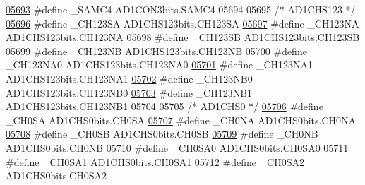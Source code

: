 \begin{DoxyCode}
\hypertarget{a00015_source_l05693}{}\hyperlink{a00015_a9f33df27be16d43c237eba25be54bc64}{05693} \textcolor{preprocessor}{#define \_SAMC4 AD1CON3bits.SAMC4}
05694 
05695 \textcolor{comment}{/* AD1CHS123 */}
\hypertarget{a00015_source_l05696}{}\hyperlink{a00015_aaf42f71d9b656791219b05c89489e988}{05696} \textcolor{preprocessor}{#define \_CH123SA AD1CHS123bits.CH123SA}
\hypertarget{a00015_source_l05697}{}\hyperlink{a00015_ad83776a4e4e301d0108ed740daf77d03}{05697} \textcolor{preprocessor}{#define \_CH123NA AD1CHS123bits.CH123NA}
\hypertarget{a00015_source_l05698}{}\hyperlink{a00015_a0a5641c7d46fca95aca3e9d1acff8efd}{05698} \textcolor{preprocessor}{#define \_CH123SB AD1CHS123bits.CH123SB}
\hypertarget{a00015_source_l05699}{}\hyperlink{a00015_aeb7833ec65c59e94d022acebe0d84ae7}{05699} \textcolor{preprocessor}{#define \_CH123NB AD1CHS123bits.CH123NB}
\hypertarget{a00015_source_l05700}{}\hyperlink{a00015_a9b01040f8d7ecfd93410b04c96d43763}{05700} \textcolor{preprocessor}{#define \_CH123NA0 AD1CHS123bits.CH123NA0}
\hypertarget{a00015_source_l05701}{}\hyperlink{a00015_a0758b5c07a1c2df628fe620f96bc9d26}{05701} \textcolor{preprocessor}{#define \_CH123NA1 AD1CHS123bits.CH123NA1}
\hypertarget{a00015_source_l05702}{}\hyperlink{a00015_a0158ee03eb7e19da73e787b21fb2ea90}{05702} \textcolor{preprocessor}{#define \_CH123NB0 AD1CHS123bits.CH123NB0}
\hypertarget{a00015_source_l05703}{}\hyperlink{a00015_a81045ebecd686d1c3a625026e842900b}{05703} \textcolor{preprocessor}{#define \_CH123NB1 AD1CHS123bits.CH123NB1}
05704 
05705 \textcolor{comment}{/* AD1CHS0 */}
\hypertarget{a00015_source_l05706}{}\hyperlink{a00015_addc950f0262798414e51a711ab581007}{05706} \textcolor{preprocessor}{#define \_CH0SA AD1CHS0bits.CH0SA}
\hypertarget{a00015_source_l05707}{}\hyperlink{a00015_ade3a9989cfe7c9951f68237646711162}{05707} \textcolor{preprocessor}{#define \_CH0NA AD1CHS0bits.CH0NA}
\hypertarget{a00015_source_l05708}{}\hyperlink{a00015_a97cee619cacc5038c1ad54f471f03e1e}{05708} \textcolor{preprocessor}{#define \_CH0SB AD1CHS0bits.CH0SB}
\hypertarget{a00015_source_l05709}{}\hyperlink{a00015_a62e3fff2c85446f1fe888e65eaa5f2e4}{05709} \textcolor{preprocessor}{#define \_CH0NB AD1CHS0bits.CH0NB}
\hypertarget{a00015_source_l05710}{}\hyperlink{a00015_a851cd43497389d6fe72ba2c79ae61a88}{05710} \textcolor{preprocessor}{#define \_CH0SA0 AD1CHS0bits.CH0SA0}
\hypertarget{a00015_source_l05711}{}\hyperlink{a00015_af5bb45276b0c675ee0fc1f5ba07f4a3e}{05711} \textcolor{preprocessor}{#define \_CH0SA1 AD1CHS0bits.CH0SA1}
\hypertarget{a00015_source_l05712}{}\hyperlink{a00015_a1642ddd51d4b723ca68ed7a35c60fc87}{05712} \textcolor{preprocessor}{#define \_CH0SA2 AD1CHS0bits.CH0SA2}

\end{DoxyCode}
